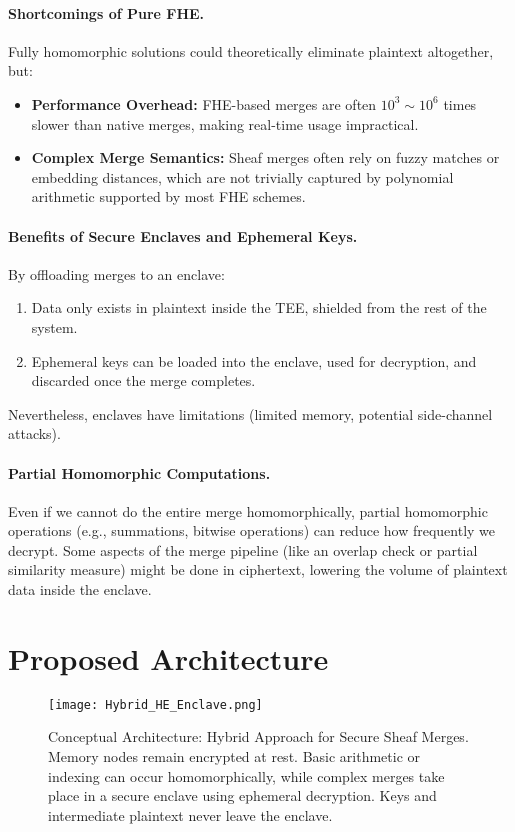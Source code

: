 \documentclass{article}
\begin{document}
\paragraph{Shortcomings of Pure FHE.}
Fully homomorphic solutions could theoretically eliminate plaintext altogether, but:
\begin{itemize}
    \item \textbf{Performance Overhead:} FHE-based merges are often $10^3 \sim 10^6$ times slower than native merges, making real-time usage impractical.
    \item \textbf{Complex Merge Semantics:} Sheaf merges often rely on fuzzy matches or embedding distances, which are not trivially captured by polynomial arithmetic supported by most FHE schemes.
\end{itemize}

\paragraph{Benefits of Secure Enclaves and Ephemeral Keys.}
By offloading merges to an enclave:
\begin{enumerate}
    \item Data only exists in plaintext inside the TEE, shielded from the rest of the system.
    \item Ephemeral keys can be loaded into the enclave, used for decryption, and discarded once the merge completes.
\end{enumerate}
Nevertheless, enclaves have limitations (limited memory, potential side-channel attacks).

\paragraph{Partial Homomorphic Computations.}
Even if we cannot do the entire merge homomorphically, partial homomorphic operations (e.g., summations, bitwise operations) can reduce how frequently we decrypt. Some aspects of the merge pipeline (like an overlap check or partial similarity measure) might be done in ciphertext, lowering the volume of plaintext data inside the enclave.

\section{Proposed Architecture}

\begin{figure}[t]
\centering
\texttt{[image: Hybrid\_HE\_Enclave.png]}
\caption{Conceptual Architecture: Hybrid Approach for Secure Sheaf Merges. Memory nodes remain encrypted at rest. Basic arithmetic or indexing can occur homomorphically, while complex merges take place in a secure enclave using ephemeral decryption. Keys and intermediate plaintext never leave the enclave.}
\label{fig:hybrid_arch}
\end{figure}
\end{document}
